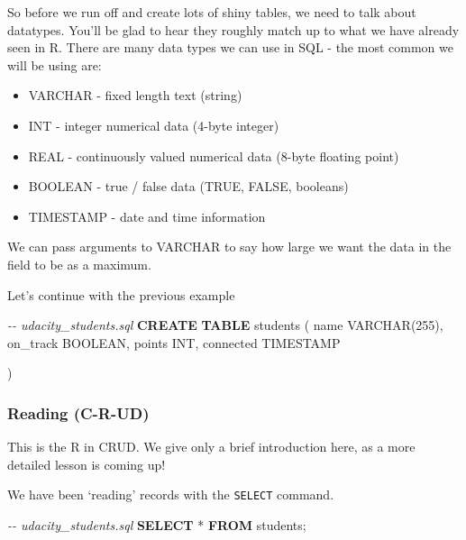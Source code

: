 \documentclass[11pt]{article}
\providecommand{\tightlist}{%
      \setlength{\itemsep}{0pt}\setlength{\parskip}{0pt}}
\newenvironment{Shaded}{}{}
\newcommand{\KeywordTok}[1]{\textcolor[rgb]{0.00,0.44,0.13}{\textbf{{#1}}}}
\newcommand{\DataTypeTok}[1]{\textcolor[rgb]{0.56,0.13,0.00}{{#1}}}
\newcommand{\DecValTok}[1]{\textcolor[rgb]{0.25,0.63,0.44}{{#1}}}
\newcommand{\CommentTok}[1]{\textcolor[rgb]{0.38,0.63,0.69}{\textit{{#1}}}}
\newcommand{\NormalTok}[1]{{#1}}
\newcommand{\OperatorTok}[1]{\textcolor[rgb]{0.40,0.40,0.40}{{#1}}}
\begin{document}
    So before we run off and create lots of shiny tables, we need to talk
about datatypes. You'll be glad to hear they roughly match up to what we
have already seen in R. There are many data types we can use in SQL -
the most common we will be using are:

\begin{itemize}
\tightlist
\item
  VARCHAR - fixed length text (string)
\item
  INT - integer numerical data (4-byte integer)
\item
  REAL - continuously valued numerical data (8-byte floating point)
\item
  BOOLEAN - true / false data (TRUE, FALSE, booleans)
\item
  TIMESTAMP - date and time information
\end{itemize}

We can pass arguments to VARCHAR to say how large we want the data in
the field to be as a maximum.

Let's continue with the previous example

\begin{Shaded}
\begin{Highlighting}[]
\CommentTok{{-}{-} udacity\_students.sql}
\KeywordTok{CREATE} \KeywordTok{TABLE}\NormalTok{ students (}
\NormalTok{  name }\DataTypeTok{VARCHAR}\NormalTok{(}\DecValTok{255}\NormalTok{),}
\NormalTok{  on\_track }\DataTypeTok{BOOLEAN}\NormalTok{,}
\NormalTok{  points  }\DataTypeTok{INT}\NormalTok{,}
\NormalTok{  connected }\DataTypeTok{TIMESTAMP}

\NormalTok{)}
\end{Highlighting}
\end{Shaded}

    \hypertarget{reading-c-r-ud}{%
\subsubsection{\texorpdfstring{Reading
(C-\textbf{R}-UD)}{Reading (C-R-UD)}}\label{reading-c-r-ud}}

This is the R in CRUD. We give only a brief introduction here, as a more
detailed lesson is coming up!

We have been `reading' records with the \texttt{SELECT} command.

\begin{Shaded}
\begin{Highlighting}[]
\CommentTok{{-}{-} udacity\_students.sql}
\KeywordTok{SELECT} \OperatorTok{*} 
\KeywordTok{FROM}\NormalTok{ students;}
\end{Highlighting}
\end{Shaded}
\end{document}
